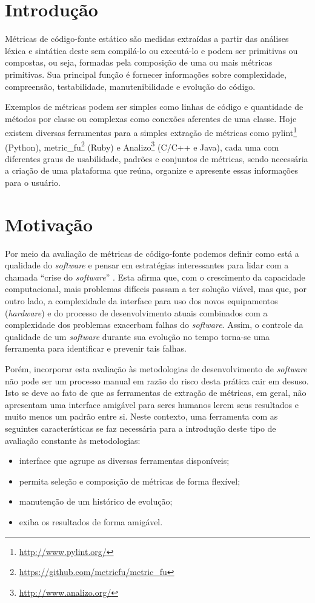 \documentclass[12pt]{article}
\begin{document}
\section{Introdução} \label{sec:intro}
Métricas de código-fonte estático são medidas extraídas a partir das análises léxica e sintática deste sem compilá-lo ou executá-lo e podem ser primitivas ou compostas, ou seja, formadas pela composição de uma ou mais métricas primitivas. Sua principal função é fornecer informações sobre complexidade, compreensão, testabilidade, manutenibilidade e evolução do código\cite{m13}.

Exemplos de métricas podem ser simples como linhas de código e quantidade de métodos por classe ou complexas como conexões aferentes de uma classe.
Hoje existem diversas ferramentas para a simples extração de métricas como  pylint\footnote{\url{http://www.pylint.org/}} (Python), metric\_fu\footnote{\url{https://github.com/metricfu/metric_fu}} (Ruby) e Analizo\footnote{\url{http://www.analizo.org/}} (C/C++ e Java), cada uma com diferentes graus de usabilidade, padrões e conjuntos de métricas, sendo necessária a criação de uma plataforma que reúna, organize e apresente essas informações para o usuário.

\section{Motivação}\label{sec:motivacao}
Por meio da avaliação de métricas de código-fonte podemos definir como está a qualidade do \textit{software} e pensar em estratégias interessantes para lidar com a chamada ``crise do \textit{software}'' \cite{nr68}. Esta afirma que, com o crescimento da capacidade computacional, mais problemas difíceis passam a ter solução viável, mas que, por outro lado, a complexidade da interface para uso dos novos equipamentos (\textit{hardware}) e do processo de desenvolvimento atuais combinados com a complexidade dos problemas exacerbam falhas do \textit{software}. Assim, o controle da qualidade de um \textit{software} durante sua evolução no tempo torna-se uma ferramenta para identificar e prevenir tais falhas.

Porém, incorporar esta avaliação às metodologias de desenvolvimento de \textit{software} não pode ser um processo manual em razão do risco desta prática cair em desuso. Isto se deve ao fato de que as ferramentas de extração de métricas, em geral, não apresentam uma interface amigável para seres humanos lerem seus resultados e muito menos um padrão entre si.
Neste contexto, uma ferramenta com as seguintes características se faz necessária para a introdução deste tipo de avaliação constante às metodologias:
\begin{itemize}
  \item interface que agrupe as diversas ferramentas disponíveis;
  \item permita seleção e composição de métricas de forma flexível;
  \item manutenção de um histórico de evolução;
  \item exiba os resultados de forma amigável.
\end{itemize}
\end{document}
